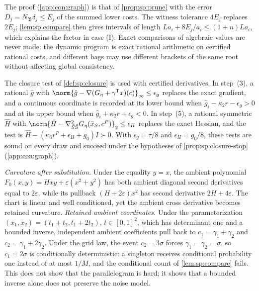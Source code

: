 The proof (\cref{app:con:graph}) is that of \cref{prop:sp:prune} with the
error $D_j=N_{\mathfrak B}\delta_j\le E_j$ of the summed lower costs. The
witness tolerance $4E_j$ replaces $2E_j$; \cref{lem:sp:compare} then gives
intervals of length $La_i+8E_j/a_i\le(1+n)La_i$, which explains the factor in
case (I). Exact comparisons of algebraic values are never made: the dynamic
program is exact rational arithmetic on certified rational costs, and
different bags may use different brackets of the same root without affecting
global consistency.

The closure test of \cref{def:sp:closure} is used with certified
derivatives. In step~(3), a rational $\hat g$ with
$\norm{\hat g-\nabla(G_\eta+\gamma^{\mathsf T}x)(c)}_\infty\le\epsilon_g$
replaces the exact gradient, and a continuous coordinate is recorded at its
lower bound when $\hat g_i-\kappa_2r-\epsilon_g>0$ and at its upper bound
when $\hat g_i+\kappa_2r+\epsilon_g<0$. In step~(5), a rational symmetric
$\hat H$ with
$\norm{\hat H-\nabla^2_{\bar S\bar S}G_\eta(\bar x_S,c^P)}_2\le\epsilon_H$
replaces the exact Hessian, and the test is
$\hat H-(\kappa_3r^P+\epsilon_H+g_0)I\succ0$. With
$\epsilon_g=\tau/8$ and $\epsilon_H=g_0/8$, these tests are sound on every
draw and succeed under the hypotheses of \cref{prop:sp:closure-stop}
(\cref{app:con:graph}).

\begin{example}\label{ex:con:graph-curv}
\emph{Curvature after substitution.} Under the equality $y=x$, the ambient
polynomial $F_0(x,y)=Hxy+\varepsilon(x^2+y^2)$ has both ambient diagonal
second derivatives equal to $2\varepsilon$, while its pullback
$(H+2\varepsilon)x^2$ has second derivative $2H+4\varepsilon$. The chart is
linear and well conditioned, yet the ambient cross derivative becomes
retained curvature. \emph{Retained ambient coordinates.} Under the
parameterization $(x_1,x_2)=(t_1+t_2,t_1+2t_2)$, $t\in[0,1]^2$, which has
determinant one and a bounded inverse, independent ambient coefficients pull
back to $c_1=\gamma_1+\gamma_2$ and $c_2=\gamma_1+2\gamma_2$. Under the grid
law, the event $c_2=3\sigma$ forces $\gamma_1=\gamma_2=\sigma$, so $c_1=2\sigma$
is conditionally deterministic: a singleton receives conditional probability
one instead of at most $1/M$, and the conditional count of
\cref{lem:sp:compare} fails. This does not show that the parallelogram is
hard; it shows that a bounded inverse alone does not preserve the noise model.
\end{example}


